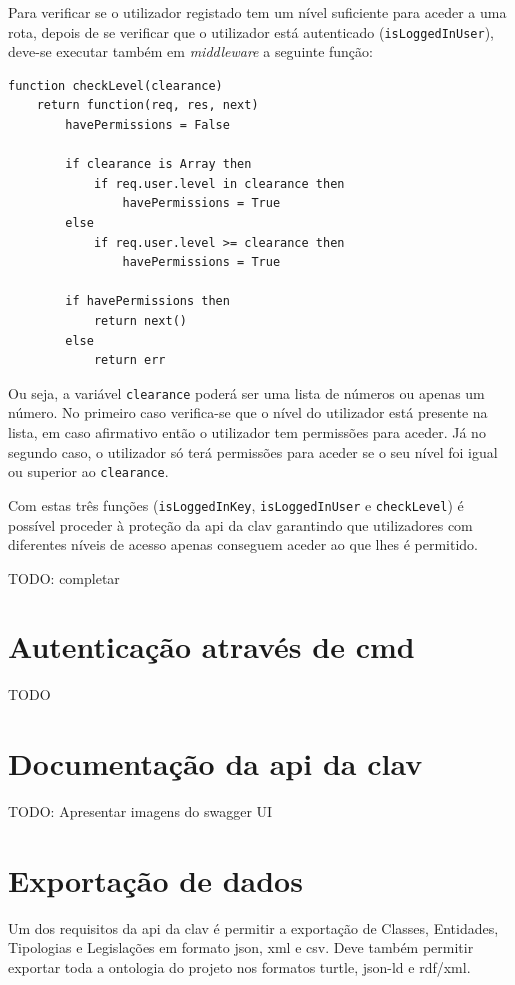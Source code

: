 Para verificar se o utilizador registado tem um nível suficiente para aceder a uma rota, depois de se verificar que o utilizador está autenticado (\texttt{isLoggedInUser}), deve-se executar também em \textit{middleware} a seguinte função:
\begin{lstlisting}[language=pseudocode, caption=Verificação se um utilizador registado tem permissões suficientes para aceder a uma determinada rota]
function checkLevel(clearance)
    return function(req, res, next)
        havePermissions = False

        if clearance is Array then
            if req.user.level in clearance then
                havePermissions = True
        else
            if req.user.level >= clearance then
                havePermissions = True

        if havePermissions then
            return next()
        else
            return err
\end{lstlisting}
Ou seja, a variável \texttt{clearance} poderá ser uma lista de números ou apenas um número. No primeiro caso verifica-se que o nível do utilizador está presente na lista, em caso afirmativo então o utilizador tem permissões para aceder. Já no segundo caso, o utilizador só terá permissões para aceder se o seu nível foi igual ou superior ao \texttt{clearance}.

Com estas três funções (\texttt{isLoggedInKey}, \texttt{isLoggedInUser} e \texttt{checkLevel}) é possível proceder à proteção da \acrshort{api} da \acrshort{clav} garantindo que utilizadores com diferentes níveis de acesso apenas conseguem aceder ao que lhes é permitido.

TODO: completar

\section{Autenticação através de \acrshort{cmd}}
TODO

\section{Documentação da \acrshort{api} da \acrshort{clav}}
TODO: Apresentar imagens do swagger UI

\section{Exportação de dados}
Um dos requisitos da \acrshort{api} da \acrshort{clav} é permitir a exportação de Classes, Entidades, Tipologias e Legislações em formato \acrshort{json}, \acrshort{xml} e \acrshort{csv}. Deve também permitir exportar toda a ontologia do projeto nos formatos \acrshort{turtle}, \acrshort{json-ld} e \acrshort{rdf}/\acrshort{xml}.

